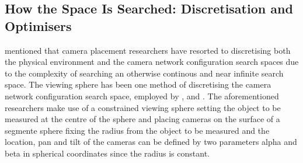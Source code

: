 \subsection{How the Space Is Searched: Discretisation and Optimisers}
\citet{zhao2013approximate} mentioned that camera placement researchers have resorted to discretising both the physical environment and the camera network configuration search spaces due to the complexity of searching an otherwise continous and near infinite search space. The viewing sphere has been one method of discretising the camera network configuration search space, employed by \citet{mason1995expert}, \cite{olague2002optimal} and \cite{rahimian2016optimal}. The aforementioned researchers make use of a constrained viewing sphere setting the object to be measured at the centre of the sphere and placing cameras on the surface of a segmente sphere fixing the radius from the object to be measured and the location, pan and tilt of the cameras can be defined by two parameters alpha and beta in spherical coordinates since the radius is constant.

